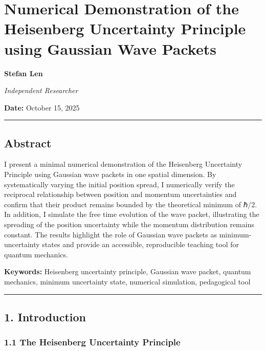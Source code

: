 \documentclass[
]{article}
\author{}
\date{}
\begin{document}
\section{Numerical Demonstration of the Heisenberg Uncertainty Principle
using Gaussian Wave
Packets}\label{numerical-demonstration-of-the-heisenberg-uncertainty-principle-using-gaussian-wave-packets}

\textbf{Stefan Len}

\emph{Independent Researcher}

\textbf{Date:} October 15, 2025

\begin{center}\rule{0.5\linewidth}{0.5pt}\end{center}

\subsection{Abstract}\label{abstract}

I present a minimal numerical demonstration of the Heisenberg
Uncertainty Principle using Gaussian wave packets in one spatial
dimension. By systematically varying the initial position spread, I
numerically verify the reciprocal relationship between position and
momentum uncertainties and confirm that their product remains bounded by
the theoretical minimum of ℏ/2. In addition, I simulate the free time
evolution of the wave packet, illustrating the spreading of the position
uncertainty while the momentum distribution remains constant. The
results highlight the role of Gaussian wave packets as
minimum-uncertainty states and provide an accessible, reproducible
teaching tool for quantum mechanics.

\textbf{Keywords:} Heisenberg uncertainty principle, Gaussian wave
packet, quantum mechanics, minimum uncertainty state, numerical
simulation, pedagogical tool

\begin{center}\rule{0.5\linewidth}{0.5pt}\end{center}

\subsection{1. Introduction}\label{introduction}

\subsubsection{1.1 The Heisenberg Uncertainty
Principle}\label{the-heisenberg-uncertainty-principle}
\end{document}
